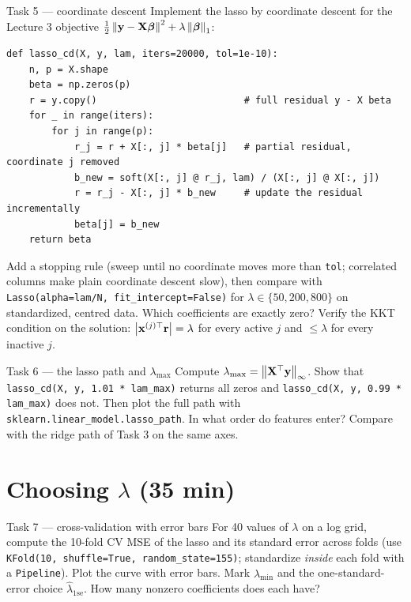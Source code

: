 \documentclass[11pt]{article}
\begin{document}
\begin{task}{Task 5 --- coordinate descent}
Implement the lasso by coordinate descent for the Lecture 3 objective $\frac12\left\lVert \mathbf{y}-\mathbf{X}\boldsymbol{\beta} \right\rVert^2+\lambda\left\lVert \boldsymbol{\beta} \right\rVert_1$:
\begin{lstlisting}
def lasso_cd(X, y, lam, iters=20000, tol=1e-10):
    n, p = X.shape
    beta = np.zeros(p)
    r = y.copy()                          # full residual y - X beta
    for _ in range(iters):
        for j in range(p):
            r_j = r + X[:, j] * beta[j]   # partial residual, coordinate j removed
            b_new = soft(X[:, j] @ r_j, lam) / (X[:, j] @ X[:, j])
            r = r_j - X[:, j] * b_new     # update the residual incrementally
            beta[j] = b_new
    return beta
\end{lstlisting}
Add a stopping rule (sweep until no coordinate moves more than \texttt{tol}; correlated columns make plain coordinate descent slow), then compare with \texttt{Lasso(alpha=lam/N, fit\_intercept=False)} for
$\lambda\in\{50,200,800\}$ on standardized, centred data. Which coefficients are exactly zero? Verify the KKT
condition on the solution: $\left\lvert \mathbf{x}^{(j)\top}\mathbf{r} \right\rvert=\lambda$ for every active $j$ and $\le\lambda$ for every inactive $j$.
\end{task}

\begin{task}{Task 6 --- the lasso path and $\lambda_{\max}$}
Compute $\lambda_{\max}=\left\lVert \mathbf{X}^{\top}\mathbf{y} \right\rVert_\infty$. Show that \texttt{lasso\_cd(X, y, 1.01 * lam\_max)} returns all
zeros and \texttt{lasso\_cd(X, y, 0.99 * lam\_max)} does not. Then plot the full path with
\texttt{sklearn.linear\_model.lasso\_path}. In what order do features enter? Compare with the ridge path of
Task 3 on the same axes.
\end{task}

\section{Choosing $\lambda$ (35 min)}

\begin{task}{Task 7 --- cross-validation with error bars}
For 40 values of $\lambda$ on a log grid, compute the 10-fold CV MSE of the lasso and its standard error
across folds (use \texttt{KFold(10, shuffle=True, random\_state=155)}; standardize \emph{inside} each fold
with a \texttt{Pipeline}). Plot the curve with error bars. Mark $\hat\lambda_{\min}$ and the one-standard-error
choice $\hat\lambda_{1\text{se}}$. How many nonzero coefficients does each have?
\end{task}
\end{document}
